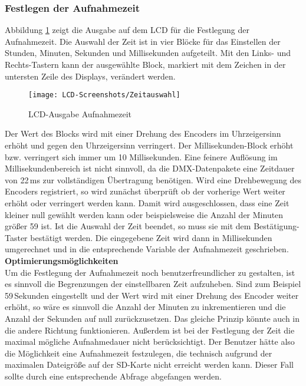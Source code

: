 \subsubsection{Festlegen der Aufnahmezeit}
Abbildung \ref{lcd:rectime} zeigt die Ausgabe auf dem LCD für die Festlegung der Aufnahmezeit. Die Auswahl der Zeit ist in vier Blöcke für das Einstellen der Stunden, Minuten, Sekunden und Millisekunden aufgeteilt. Mit den Links- und Rechts-Tastern kann der ausgewählte Block, markiert mit dem Zeichen in der untersten Zeile des Displays, verändert werden. 
\begin{figure}[h]
	\begin{center}
		\texttt{[image: LCD-Screenshots/Zeitauswahl]}
		\caption{LCD-Ausgabe Aufnahmezeit}
		\label{lcd:rectime}
	\end{center}
\end{figure}
Der Wert des Blocks wird mit einer Drehung des Encoders im Uhrzeigersinn erhöht und gegen den Uhrzeigersinn verringert. Der Millisekunden-Block erhöht bzw. verringert sich immer um 10 Millisekunden. Eine feinere Auflösung im Millisekundenbereich ist nicht sinnvoll, da die DMX-Datenpakete eine Zeitdauer von 22\,ms zur vollständigen Übertragung benötigen. Wird eine Drehbewegung des Encoders registriert, so wird zunächst überprüft ob der vorherige Wert weiter erhöht oder verringert werden kann. Damit wird ausgeschlossen, dass eine Zeit kleiner null gewählt werden kann oder beispielsweise die Anzahl der Minuten größer 59 ist. Ist die Auswahl der Zeit beendet, so muss sie mit dem Bestätigung-Taster bestätigt werden. Die eingegebene Zeit wird dann in Millisekunden umgerechnet und in die entsprechende Variable der Aufnahmezeit geschrieben.\\
\newline
\textbf{Optimierungsmöglichkeiten}\\
Um die Festlegung der Aufnahmezeit noch benutzerfreundlicher zu gestalten, ist es sinnvoll die Begrenzungen der einstellbaren Zeit aufzuheben. Sind zum Beispiel 59\,Sekunden eingestellt und der Wert wird mit einer Drehung des Encoder weiter erhöht, so wäre es sinnvoll die Anzahl der Minuten zu inkrementieren und die Anzahl der Sekunden auf null zurückzusetzen. Das gleiche Prinzip könnte auch in die andere Richtung funktionieren. Außerdem ist bei der Festlegung der Zeit die maximal mögliche Aufnahmedauer nicht berücksichtigt. Der Benutzer hätte also die Möglichkeit eine Aufnahmezeit festzulegen, die technisch aufgrund der maximalen Dateigröße auf der SD-Karte nicht erreicht werden kann. Dieser Fall sollte durch eine entsprechende Abfrage abgefangen werden.
